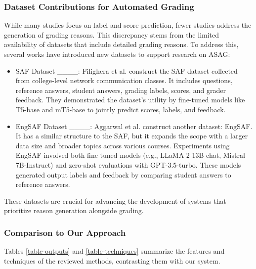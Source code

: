 \subsubsection{Dataset Contributions for Automated Grading}
While many studies focus on label and score prediction, fewer studies address the generation of grading reasons.
This discrepancy stems from the limited availability of datasets that include detailed grading reasons.
To address this, several works have introduced new datasets to support research on ASAG:

\begin{itemize}
    \item SAF Dataset ____: Filighera et al. construct the SAF dataset collected from college-level network communication classes. It includes questions, reference answers, student answers, grading labels, scores, and grader feedback. They demonstrated the dataset's utility by fine-tuned models like T5-base and mT5-base to jointly predict scores, labels, and feedback.

    \item EngSAF Dataset ____: Aggarwal et al. construct another dataset: EngSAF. It has a similar structure to the SAF, but it expands the scope with a larger data size and broader topics across various courses. Experiments using EngSAF involved both fine-tuned models (e.g., LLaMA-2-13B-chat, Mistral-7B-Instruct) and zero-shot evaluations with GPT-3.5-turbo. These models generated output labels and feedback by comparing student answers to reference answers.
\end{itemize}

These datasets are crucial for advancing the development of systems that prioritize reason generation alongside grading.

\subsubsection{Comparison to Our Approach}

Tables \ref{table-outputs} and \ref{table-techniques} summarize the features and techniques of the reviewed methods, contrasting them with our system.

